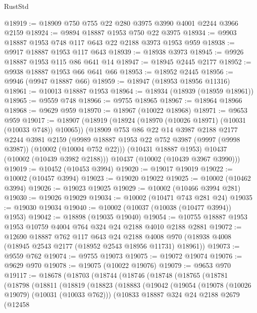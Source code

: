 \begin{lexlean}{RustStd}
\begin{coremodule}
@18919 := @18909 @750 @755 @22 @280 @3975 @3990 @4001 @2244 @3966 @2159
@18924 := @9894 @18887 @1953 @750 @22 @3975
@18934 := @9903 @18887 @1953 @748 @117 @643 @22 @2188 @3973 @1953 @959
@18938 := @9917 @18887 @1953 @117 @643
@18939 := @18938 @3973
@18945 := @9926 @18887 @1953 @115 @86 @641 @14
@18947 := @18945 @2445 @2177
@18952 := @9938 @18887 @1953 @66 @641 @66
@18953 := @18952 @2445
@18956 := @9946 (@9947 @18887 @66)
@18959 := @18947 (@18953 @18956 @11316)
@18961 := @10013 @18887 @1953
@18964 := @18934 (@18939 (@18959 @18961))
@18965 := @9559 @748
@18966 := @9755 @18965
@18967 := @18964 @18966
@18968 := @9629 @959
@18970 := @18967 (@10022 @18968)
@18971 := @9653 @959
@19017 := @18907
    (@18919
      (@18924 (@18970 (@10026 @18971) (@10031 (@10033 @748)) @10065))
      (@18909
        @753
        @86
        @22
        @14
        @3987
        @2188
        @2177
        @2244
        @3981
        @2159
        (@9989 @18887 @1953 @22 @752 @3987 (@9997 (@9998 @3987)) (@10002 (@10004 @752 @22)))
        (@10431 @18887 @1953)
        @10437
        (@10002 (@10439 @3982 @2188)))
      @10437
      (@10002 (@10439 @3967 @3990)))
@19019 := @10452 (@10453 @3994)
@19020 := @19017 @19019
@19022 := @10002 (@10457 @3994)
@19023 := @19020 @19022
@19025 := @10002 (@10462 @3994)
@19026 := @19023 @19025
@19029 := @10002 (@10466 @3994 @281)
@19030 := @19026 @19029
@19034 := @10002 (@10471 @743 @281 @24)
@19035 := @19030 @19034
@19040 := @10002 (@10037 (@10038 (@10477 @3994)) @1953)
@19042 := @18898 (@19035 @19040)
@19054 := @10755 @18887 @1953 @1953 @10759 @4004 @764 @324 @24 @2188 @4010 @2188 @2881
@19072 := @12690
    @18887
    @762
    @117
    @643
    @24
    @2188
    @4008
    @970
    (@18938 @4008 (@18945 @2543 @2177 (@18952 @2543 @18956 @11731) @18961))
@19073 := @9559 @762
@19074 := @9755 @19073
@19075 := @19072 @19074
@19076 := @9629 @970
@19078 := @19075 (@10022 @19076)
@19079 := @9653 @970
@19117 := @18678
    (@18703
      (@18744
        (@18746
          (@18748
            (@18765
              (@18781
                (@18798
                  (@18811
                    (@18819
                      (@18823
                        (@18883
                          (@19042
                            (@19054
                              (@19078 (@10026 @19079) (@10031 (@10033 @762)))
                              (@10833
                                @18887
                                @324
                                @24
                                @2188
                                @2679
                                (@12458

\end{coremodule}
\end{lexlean}
